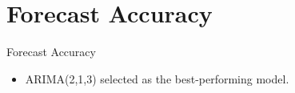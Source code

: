 \documentclass[11pt]{beamer}
\begin{document}
	\section{Forecast Accuracy}
	\begin{frame}{Forecast Accuracy}
		\begin{itemize}
			\item ARIMA(2,1,3) selected as the best-performing model.
		\end{itemize}
	
				\begin{table}[h!]
					\centering
					\footnotesize
					\renewcommand{\arraystretch}{0.9} %
					\setlength{\tabcolsep}{6pt} %
					

\end{table}
\end{frame}
\end{document}
